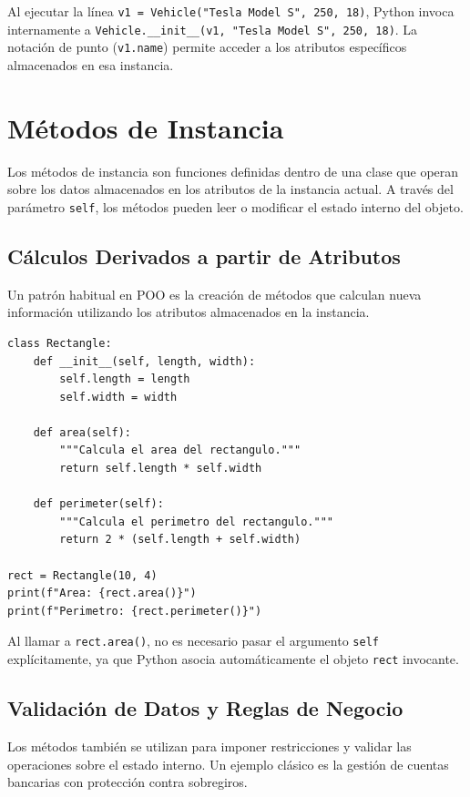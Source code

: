Al ejecutar la línea \texttt{v1 = Vehicle("Tesla Model S", 250, 18)}, Python invoca internamente a
\texttt{Vehicle.\_\_init\_\_(v1, "Tesla Model S", 250, 18)}. La notación de punto (\texttt{v1.name})
permite acceder a los atributos específicos almacenados en esa instancia.

\section{Métodos de Instancia}
Los métodos de instancia son funciones definidas dentro de una clase que operan sobre los datos almacenados
en los atributos de la instancia actual. A través del parámetro \texttt{self}, los métodos pueden leer o modificar
el estado interno del objeto.

\subsection{Cálculos Derivados a partir de Atributos}
Un patrón habitual en POO es la creación de métodos que calculan nueva información utilizando los atributos
almacenados en la instancia.

\begin{lstlisting}[caption={Clase Rectangle con métodos de cálculo geométrico.}, label={list:rectangle}]
class Rectangle:
    def __init__(self, length, width):
        self.length = length
        self.width = width

    def area(self):
        """Calcula el area del rectangulo."""
        return self.length * self.width

    def perimeter(self):
        """Calcula el perimetro del rectangulo."""
        return 2 * (self.length + self.width)

rect = Rectangle(10, 4)
print(f"Area: {rect.area()}")
print(f"Perimetro: {rect.perimeter()}")
\end{lstlisting}

Al llamar a \texttt{rect.area()}, no es necesario pasar el argumento \texttt{self} explícitamente, ya que Python
asocia automáticamente el objeto \texttt{rect} invocante.

\subsection{Validación de Datos y Reglas de Negocio}
Los métodos también se utilizan para imponer restricciones y validar las operaciones sobre el estado interno.
Un ejemplo clásico es la gestión de cuentas bancarias con protección contra sobregiros.

